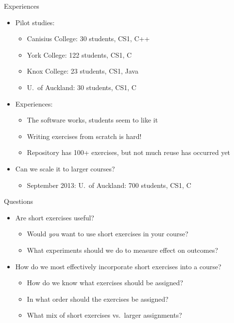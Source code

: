 \documentclass{beamer}
\begin{document}
\begin{frame}{Experiences}

\begin{itemize}
\item Pilot studies:
  \begin{itemize}
  \item Canisius College: 30 students, CS1, C++
  \item York College: 122 students, CS1, C
  \item Knox College: 23 students, CS1, Java
  \item U.\ of Auckland: 30 students, CS1, C
  \end{itemize}
\item Experiences:
  \begin{itemize}
  \item The software works, students seem to like it
  \item Writing exercises from scratch is hard!
  \item Repository has 100+ exercises, but not much reuse has occurred yet
  \end{itemize}
\item Can we scale it to larger courses?
  \begin{itemize}
\item September 2013: U.\ of Auckland: 700 students, CS1, C
  \end{itemize}
\end{itemize}

\end{frame}


\begin{frame}{Questions}

\begin{itemize}
\item Are short exercises useful?
  \begin{itemize}
  \item Would {\em you} want to use short exercises in your course?
  \item What experiments should we do to measure effect on outcomes?
  \end{itemize}
\item How do we most effectively incorporate short exercises into a course?
  \begin{itemize}
  \item How do we know what exercises should be assigned?
  \item In what order should the exercises be assigned?
  \item What mix of short exercises vs.\ larger assignments?
  \end{itemize}
\end{itemize}

\end{frame}
\end{document}

